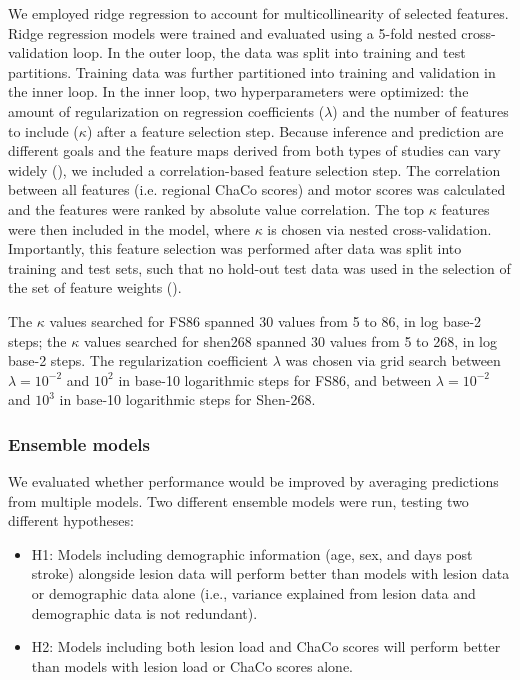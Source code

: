 \documentclass[10pt]{article}
\begin{document}
We employed ridge regression to account for multicollinearity of selected features. Ridge regression models were trained and evaluated using a 5-fold nested cross-validation loop. In the outer loop, the data was split into training and test partitions. Training data was further partitioned into training and validation in the inner loop. In the inner loop, two hyperparameters were optimized: the amount of regularization on regression coefficients ($\lambda$) and the number of features to include ($\kappa$) after a feature selection step. 
Because inference and prediction are different goals and the feature maps derived from both types of studies can vary widely (\cite{Sperber2021-lw, Bzdok2020-py}), we included a correlation-based feature selection step. 
The correlation between all features (i.e. regional ChaCo scores) and motor scores was calculated and the features were ranked by absolute value correlation. The top $\kappa$ features were then included in the model, where $\kappa$ is chosen via nested cross-validation. Importantly, this feature selection was performed after data was split into training and test sets, such that no hold-out test data was used in the selection of the set of feature weights (\cite{Hastie2001-or}). 
 
The $\kappa$ values searched for FS86 spanned 30 values from 5 to 86, in log base-2 steps; the $\kappa$ values searched for shen268 spanned 30 values from 5 to 268, in log base-2 steps. The regularization coefficient $\lambda$ was chosen via grid search between $\lambda = 10^{-2}$ and $10^2$ in base-10 logarithmic steps for FS86, and between $\lambda = 10^{-2}$ and $10^3$ in base-10 logarithmic steps for Shen-268. 

\subsubsection{Ensemble models}
We evaluated whether performance would be improved by averaging predictions from multiple models. Two different ensemble models were run, testing two different hypotheses:

\begin{itemize}
\item H1: Models including demographic information (age, sex, and days post stroke) alongside lesion data will perform better than models with lesion data or demographic data alone (i.e., variance explained from lesion data and demographic data is not redundant).
\item H2: Models including both lesion load and ChaCo scores will perform better than models with lesion load or ChaCo scores alone.
\end{itemize}
\end{document}

